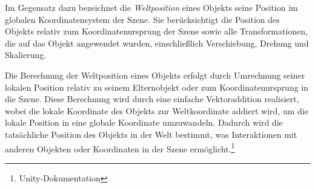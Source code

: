 Im Gegensatz dazu bezeichnet die \textit{Weltposition} eines Objekts seine Position im globalen Koordinatensystem der
Szene. Sie berücksichtigt die Position des Objekts relativ zum Koordinatenursprung der Szene sowie alle Transformationen,
die auf das Objekt angewendet wurden, einschließlich Verschiebung, Drehung und Skalierung.

Die Berechnung der Weltposition eines Objekts erfolgt durch Umrechnung seiner lokalen Position relativ zu seinem Elternobjekt
oder zum Koordinatenursprung in die Szene. Diese Berechnung wird durch eine einfache Vektoraddition realisiert, wobei
die lokale Koordinate des Objekts zur Weltkoordinate addiert wird, um die lokale Position in eine globale Koordinate
umzuwandeln. Dadurch wird die tatsächliche Position des Objekts in der Welt bestimmt, was Interaktionen mit anderen
Objekten oder Koordinaten in der Szene ermöglicht.\footnote{Unity-Dokumentation\cite{Lokal- und Weltposition}}

